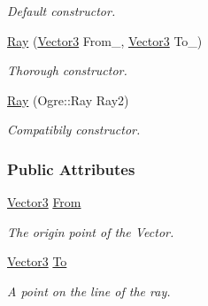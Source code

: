 \begin{DoxyCompactItemize}
\begin{DoxyCompactList}\small\item\em Default constructor. \item\end{DoxyCompactList}\item 
\hyperlink{classMezzanine_1_1Ray_a9b7c14d23e934927b6c35b81c65b9916}{Ray} (\hyperlink{classMezzanine_1_1Vector3}{Vector3} From\_\-, \hyperlink{classMezzanine_1_1Vector3}{Vector3} To\_\-)
\begin{DoxyCompactList}\small\item\em Thorough constructor. \item\end{DoxyCompactList}\item 
\hyperlink{classMezzanine_1_1Ray_a60cc4b4fd34049f7cb36d8aa402f9005}{Ray} (Ogre::Ray Ray2)
\begin{DoxyCompactList}\small\item\em Compatibily constructor. \item\end{DoxyCompactList}\end{DoxyCompactItemize}
\subsubsection*{Public Attributes}
\begin{DoxyCompactItemize}
\item 
\hypertarget{classMezzanine_1_1Ray_ab4bd29b181c9a2b405ca320ccf9b5b37}{
\hyperlink{classMezzanine_1_1Vector3}{Vector3} \hyperlink{classMezzanine_1_1Ray_ab4bd29b181c9a2b405ca320ccf9b5b37}{From}}
\label{classMezzanine_1_1Ray_ab4bd29b181c9a2b405ca320ccf9b5b37}

\begin{DoxyCompactList}\small\item\em The origin point of the Vector. \item\end{DoxyCompactList}\item 
\hypertarget{classMezzanine_1_1Ray_a40c41932b49c6b8b04b2558952503d1f}{
\hyperlink{classMezzanine_1_1Vector3}{Vector3} \hyperlink{classMezzanine_1_1Ray_a40c41932b49c6b8b04b2558952503d1f}{To}}
\label{classMezzanine_1_1Ray_a40c41932b49c6b8b04b2558952503d1f}

\begin{DoxyCompactList}\small\item\em A point on the line of the ray. \item\end{DoxyCompactList}\end{DoxyCompactItemize}


